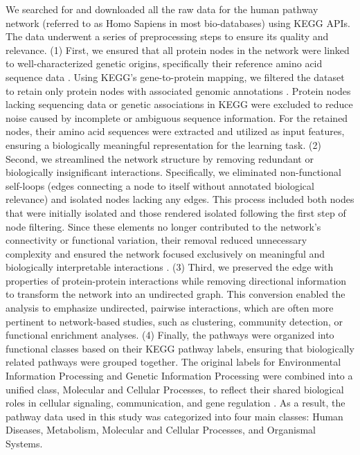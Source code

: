 We searched for and downloaded all the raw data for the human pathway network (referred to as Homo Sapiens in most bio-databases) using KEGG APIs.
The data underwent a series of preprocessing steps to ensure its quality and relevance.
(1) First, we ensured that all protein nodes in the network were linked to well-characterized genetic origins, specifically their reference amino acid sequence data \cite{keggseq}. 
Using KEGG's gene-to-protein mapping, we filtered the dataset to retain only protein nodes with associated genomic annotations \cite{keggmapper}. 
Protein nodes lacking sequencing data or genetic associations in KEGG were excluded to reduce noise caused by incomplete or ambiguous sequence information. 
For the retained nodes, their amino acid sequences were extracted and utilized as input features, ensuring a biologically meaningful representation for the learning task.
(2) Second, we streamlined the network structure by removing redundant or biologically insignificant interactions. 
Specifically, we eliminated non-functional self-loops (edges connecting a node to itself without annotated biological relevance) and isolated nodes lacking any edges. 
This process included both nodes that were initially isolated and those rendered isolated following the first step of node filtering. 
Since these elements no longer contributed to the network's connectivity or functional variation, their removal reduced unnecessary complexity and ensured the network focused exclusively on meaningful and biologically interpretable interactions \cite{clean}.
(3) Third, we preserved the edge with properties of protein-protein interactions while removing directional information to transform the network into an undirected graph. 
This conversion enabled the analysis to emphasize undirected, pairwise interactions, which are often more pertinent to network-based studies, such as clustering, community detection, or functional enrichment analyses.
(4) Finally, the pathways were organized into functional classes based on their KEGG pathway labels, ensuring that biologically related pathways were grouped together. 
The original labels for Environmental Information Processing and Genetic Information Processing were combined into a unified class, Molecular and Cellular Processes, to reflect their shared biological roles in cellular signaling, communication, and gene regulation \cite{kegglabel}. 
As a result, the pathway data used in this study was categorized into four main classes: Human Diseases, Metabolism, Molecular and Cellular Processes, and Organismal Systems.


